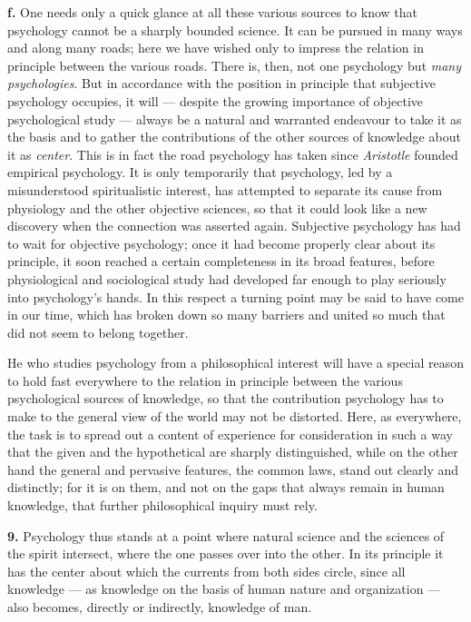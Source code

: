 \documentclass[12pt,a4paper]{book}
\newcommand{\opage}[1]{\marginnote{\footnotesize\textit{[#1]}}}
\begin{document}
\textbf{f.} One needs only a quick glance at all these various sources to
know that psychology cannot be a sharply bounded science. It can be
pursued in many ways and along many roads; here we have wished only to
impress the relation in principle between the various roads. There is,
then, not one psychology but \emph{many psychologies}. But in accordance
with the position in principle that subjective psychology occupies, it
will --- despite the growing importance of objective psychological
study --- always be a natural and warranted endeavour to take it as the
basis and to gather the contributions of the other sources of knowledge
about it as \emph{center}. This is in fact the road psychology has taken
since \emph{Aristotle} founded empirical psychology. It is only
temporarily that psychology, led by a misunderstood spiritualistic
interest, has attempted to separate its cause from physiology and the
other objective sciences, so that it could look like a new discovery when
the connection was asserted again. Subjective psychology has had to wait
for objective psychology; once it had become properly clear about its
\opage{33}principle, it soon reached a certain completeness in its broad
features, before physiological and sociological study had developed far
enough to play seriously into psychology's hands. In this respect a
turning point may be said to have come in our time, which has broken
down so many barriers and united so much that did not seem to belong
together.

He who studies psychology from a philosophical interest will have a
special reason to hold fast everywhere to the relation in principle
between the various psychological sources of knowledge, so that the
contribution psychology has to make to the general view of the world may
not be distorted. Here, as everywhere, the task is to spread out a
content of experience for consideration in such a way that the given and
the hypothetical are sharply distinguished, while on the other hand the
general and pervasive features, the common laws, stand out clearly and
distinctly; for it is on them, and not on the gaps that always remain in
human knowledge, that further philosophical inquiry must rely.

\textbf{9.} Psychology thus stands at a point where natural science and
the sciences of the spirit intersect, where the one passes over into the
other. In its principle it has the center about which the currents from
both sides circle, since all knowledge --- as knowledge on the basis of
human nature and organization --- also becomes, directly or indirectly,
knowledge of man.
\end{document}
